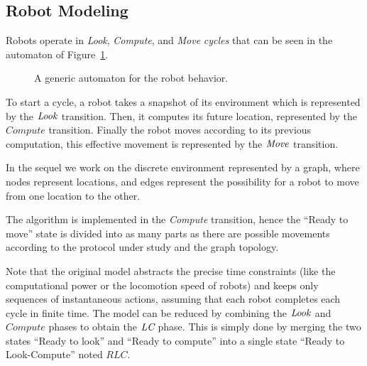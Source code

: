   
		\subsection{Robot Modeling}
 \label{sec:mod:robots}  
 Robots operate in \emph{Look}, \emph{Compute}, and
 \emph{Move} \emph{cycles} that can be seen in the automaton of
 Figure~\ref{fig:1}. 
\begin{figure}[htbp] 
\centering 
{}
\caption{A generic automaton for the robot behavior.} 
\label{fig:1}
\end{figure}

To start a cycle, a robot takes a snapshot of its environment which is
represented by the $\mathit{Look}$ transition. Then, it computes its
future location, represented by the $\textit{Compute}$
transition. Finally the robot moves according to its previous 
computation, this effective movement is represented by 
the $\mathit{Move}$ transition.

In the sequel we work on the discrete environment represented by a graph,
where nodes represent locations, and edges represent the possibility 
for a robot to move from one location to the other. 


The algorithm is implemented in the \emph{Compute} transition, hence
the ``Ready to move'' state is divided into as many parts as there are
possible movements according to the protocol under study and the 
graph topology.
 

Note that the original model abstracts the precise time constraints (like 
the computational power or the locomotion speed of robots) and keeps
only sequences of instantaneous actions, assuming that each robot 
completes each cycle in finite time. The model can be reduced by combining
the $\mathit{Look}$ and $\textit{Compute}$ phases to obtain the $\textit{LC}$
phase. This is simply done by merging the two states ``Ready to look''
and ``Ready to compute'' into a single state ``Ready to Look-Compute'' noted $\textit{RLC}$.

